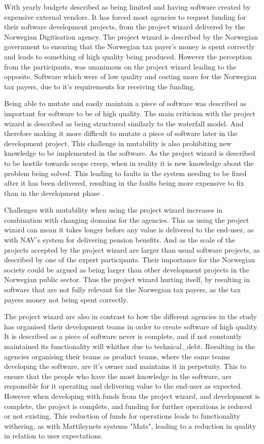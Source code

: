 With yearly budgets described as being limited and having software created by expensive external vendors. It has forced most agencies to request funding for their software development projects, from the project wizard delivered by the Norwegian Digitisation agency. The project wizard is described by the Norwegian government to ensuring that the Norwegian tax payer's money is spent correctly and leads to something of high quality being produced. However the perception from the participants, was unanimous on the project wizard leading to the opposite. Software which were of low quality and costing more for the Norwegian tax payers, due to it's requirements for receiving the funding.

Being able to mutate and easily maintain a piece of software was described as important for software to be of high quality. The main criticism with the project wizard is described as being structured similarly to the waterfall model. And therefore making it more difficult to mutate a piece of software later in the development project. This challenge in mutability is also prohibiting new knowledge to be implemented in the software. As the project wizard is described to be hostile towards scope creep, when in reality it is new knowledge about the problem being solved. This leading to faults in the system needing to be fixed after it has been delivered, resulting in the faults being more expensive to fix than in the development phase \cite{sh_2018}\cite{csw_2011}.

 Challenges with mutability when using the project wizard increases in combination with changing domains for the agencies. This as using the project wizard can mean it takes longer before any value is delivered to the end-user, as with NAV's system for delivering pension benefits. And as the scale of the projects accepted by the project wizard are larger than usual software projects, as described by one of the expert participants. Their importance for the Norwegian society could be argued as being larger than other development projects in the Norwegian public sector. Thus the project wizard hurting itself, by resulting in software that are not fully relevant for the Norwegian tax payers, as the tax payers money not being spent correctly.

The project wizard are also in contrast to how the different agencies in the study has organised their development teams in order to create software of high quality. It is described as a piece of software never is complete, and if not constantly maintained its functionality will whither due to \gls{technical_debt}. Resulting in the agencies organising their teams as product teams, where the same teams developing the software, are it's owner and maintains it in perpetuity. This to ensure that the people who have the most knowledge in the software, are responsible for it operating and delivering value to the end-user as expected. However when developing with funds from the project wizard, and development is complete, the project is complete, and funding for further operations is reduced or not existing. This reduction of funds for operations leads to functionality withering, as with Mattilsynets systems "Mats", leading to a reduction in quality in relation to user expectations.

